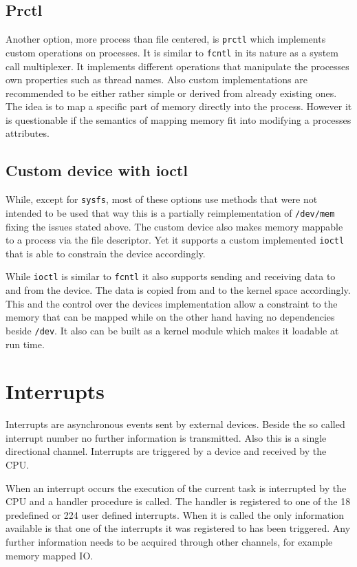 \documentclass[
a4paper,
12pt,
notitlepage,
parskip=half,
DIV=11,
]{scrbook}
\begin{document}
		\subsection{Prctl}
		
		Another option, more process than file centered, is \texttt{prctl} which implements custom operations on processes.
		It is similar to \texttt{fcntl} in its nature as a system call multiplexer.
		It implements different operations that manipulate the processes own properties such as thread names.
		Also custom implementations are recommended to be either rather simple or derived from already existing ones.
		The idea is to map a specific part of memory directly into the process.
		However it is questionable if the semantics of mapping memory fit into modifying a processes attributes. \citep{syscall} \citep{prctl}
		
		\subsection{Custom device with ioctl}
		\label{hwio}
		
		While, except for \texttt{sysfs}, most of these options use methods that were not intended to be used that way this is a partially reimplementation of \texttt{/dev/mem} fixing the issues stated above.
		The custom device also makes memory mappable to a process via the file descriptor.
		Yet it supports a custom implemented \texttt{ioctl} that is able to constrain the device accordingly.
		
		While \texttt{ioctl} is similar to \texttt{fcntl} it also supports sending and receiving data to and from the device.
		The data is copied from and to the kernel space accordingly.
		This and the control over the devices implementation allow a constraint to the memory that can be mapped while on the other hand having no dependencies beside \texttt{/dev}.
		It also can be built as a kernel module which makes it loadable at run time. \citep{ioctl}
		
		\section{Interrupts}
		
		Interrupts are asynchronous events sent by external devices.
		Beside the so called interrupt number no further information is transmitted.
		Also this is a single directional channel.
		Interrupts are triggered by a device and received by the CPU.
		
		When an interrupt occurs the execution of the current task is interrupted by the CPU and a handler procedure is called.
		The handler is registered to one of the 18 predefined or 224 user defined interrupts.
		When it is called the only information available is that one of the interrupts it was registered to has been triggered.
		Any further information needs to be acquired through other channels, for example memory mapped IO. \citep{intelmanual}
		
\end{document}
